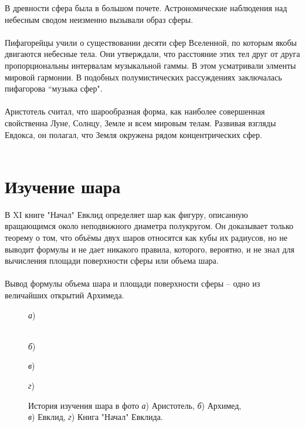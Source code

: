 \documentclass[14pt,a4paper]{report}
\begin{document}
В древности сфера была в большом почете. Астрономические наблюдения над небесным сводом неизменно вызывали образ сферы. \\\\
Пифагорейцы учили о существовании десяти сфер Вселенной, по которым якобы двигаются небесные тела. Они утверждали, что расстояние этих тел друг от друга пропорциональны интервалам музыкальной гаммы. В этом усматривали элменты мировой гармонии. В подобных полумистических рассуждениях заключалась пифагорова ``музыка сфер". \\\\
Аристотель считал, что шарообразная форма, как наиболее совершенная свойственна Луне, Солнцу, Земле и всем мировым телам. Развивая взгляды Евдокса, он полагал, что Земля окружена рядом концентрических сфер. \\\\

\section[Изучение шара]{Изучение шара}

В XI книге "Начал" Евклид определяет шар как фигуру, описанную вращающимся около неподвижного диаметра полукругом. Он доказывает только теорему о том, что объёмы двух шаров относятся как кубы их радиусов, но не выводит формулы и не дает никакого правила, которого, вероятно, и не знал для вычисления площади поверхности сферы или объема шара. \\\\
Вывод формулы объема шара и площади поверхности сферы -- одно из величайших открытий Архимеда.

\newpage

\begin{figure}
\begin{minipage}{0.32\linewidth}
     \textit{а}) \\
\end{minipage}
    \hfill
\begin{minipage}{0.32\linewidth}
     \\ \textit{б})
\end{minipage}
    \vfill
\begin{minipage}{0.32\linewidth}
     \textit{в}) \\
\end{minipage}
    \hfill
\begin{minipage}{0.5\linewidth}
     \textit{г}) \\
\end{minipage}
\caption{История изучения шара в фото \textit{а}) Аристотель, \textit{б})
Архимед, \\ \textit{в}) Евклид, \textit{г}) Книга "Начал" Евклида.}
\end{figure}
\end{document}
